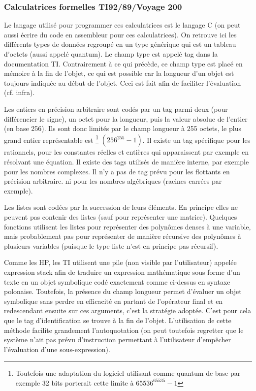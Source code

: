 \documentclass[a4paper,11pt]{article}
\begin{document}
\begin{giacjshere}
\subsubsection{Calculatrices formelles TI92/89/Voyage 200}
Le langage utilis\'e pour programmer ces calculatrices est le langage C
(on peut aussi \'ecrire du code en assembleur pour ces calculatrices).
On retrouve ici les diff\'erents types de donn\'ees regroup\'e en un
type g\'en\'erique qui est un tableau d'octets (aussi appelé quantum). 
Le champ type
est appel\'e tag dans la documentation TI. Contrairement \`a ce qui
pr\'ec\`ede, ce champ type est plac\'e en m\'emoire \`a la fin de l'objet,
ce qui est possible car la longueur d'un objet est toujours indiqu\'ee
au d\'ebut de l'objet. Ceci est fait afin de faciliter l'évaluation (cf.
infra).

Les entiers en précision arbitraire sont codés par un tag parmi deux (pour
différencier le signe), un octet pour la longueur, puis la valeur
absolue de l'entier (en base 256). Ils sont donc limités par le
champ longueur à 255 octets, le plus grand entier représentable est
\footnote{Toutefois une adaptation du logiciel utilisant comme
quantum de base par exemple 32 bits porterait cette limite
à $65536^{65535}-1$} $(256^{255}-1)$.
Il existe un tag spécifique pour les rationnels, pour les constantes 
réelles et entières qui apparaissent par exemple en r\'esolvant une \'equation.
Il existe des tags utilisés de manière interne, par exemple
pour les nombres complexes. 
Il n'y a pas de tag prévu pour les flottants en précision arbitraire.
ni pour les nombres algébriques (racines carrées par 
exemple).

Les listes sont codées par la succession de leurs éléments. En principe
elles ne peuvent pas contenir des listes (sauf pour repr\'esenter
une matrice).
Quelques fonctions utilisent les listes pour représenter des polynômes 
denses à une variable, mais probablement pas pour représenter de manière
récursive des polynômes à plusieurs variables (puisque le type liste
n'est en principe pas récursif).

Comme les HP, les TI utilisent une pile (non visible par
l'utilisateur) appelée expression stack
afin de traduire un expression math\'ematique sous forme d'un texte
en un objet symbolique cod\'e exactement comme ci-dessus en syntaxe
polonaise. Toutefois, la pr\'esence du champ longueur
permet d'\'evaluer un objet symbolique sans perdre en efficacit\'e
en partant de l'op\'erateur
final et en redescendant ensuite sur ces arguments, c'est la stratégie
adoptée. C'est pour cela que le tag d'identification
se trouve à la fin de l'objet. L'utilisation de cette méthode
facilite grandement l'autoquotation (on peut toutefois regretter
que le système n'ait pas prévu d'instruction permettant à l'utilisateur 
d'emp\^echer l'évaluation d'une sous-expression).


\end{giacjshere}
\end{document}
